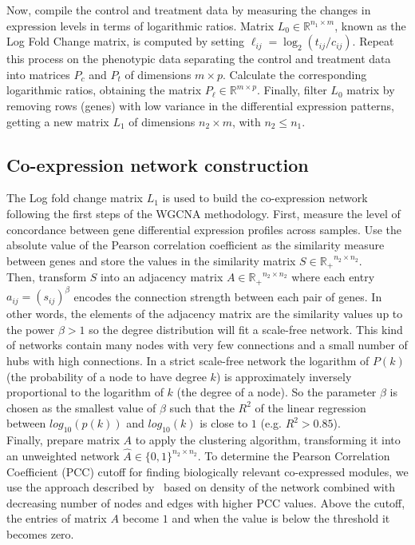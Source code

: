 \documentclass[12pt,journal, onecolumn]{IEEEtran}
\begin{document}
Now, compile the control and treatment data by measuring the changes in expression levels in terms of logarithmic ratios. Matrix $L_0 \in \mathbb{R}^{n_1 \times m}$, known as the Log Fold Change matrix, is computed by setting $\ell_{ij}=\log_2 (t_{ij}/c_{ij})$. Repeat this process on the phenotypic data separating the control and treatment data into matrices $P_c$ and $P_t$ of dimensions $m \times p$. Calculate the corresponding logarithmic ratios, obtaining the matrix $P_\ell \in \mathbb{R}^{m \times p}$. Finally, filter $L_0$ matrix by removing rows (genes) with low variance in the differential expression patterns, getting a new matrix $L_1$ of dimensions $n_2 \times m$, with $n_2 \leq n_1$.\\


\subsection{Co-expression network construction}

The Log fold change matrix $L_1$ is used to build the co-expression network following the first steps of the WGCNA methodology. First, measure the level of concordance between gene differential expression profiles across samples. Use the absolute value of the Pearson correlation coefficient as the similarity measure between genes and store the values in the similarity matrix $S\in \mathbb{R_{+}}^{n_2 \times n_2}$.\\

Then, transform $S$ into an adjacency matrix $A \in \mathbb{R_+}^{n_2\times n_2}$ where each entry $a_{ij} = (s_{ij})^\beta $ encodes the connection strength between each pair of genes. In other words, the elements of the adjacency matrix are the similarity values up to the power $\beta > 1$ so the degree distribution will fit a scale-free network. This kind of networks contain many nodes with very few connections and a small number of hubs with high connections. In a strict scale-free network the logarithm of $P(k)$ (the probability of a node to have degree $k$) is approximately inversely proportional to the logarithm of $k$ (the degree of a node). So the parameter $\beta$ is chosen as the smallest value of $\beta$ such that the $R^2$ of the linear regression between $log_{10}(p(k))$ and $log_{10}(k)$ is close to $1$ (e.g. $R^2 > 0.85$). \\

Finally, prepare matrix $A$ to apply the clustering algorithm, transforming it into an unweighted network $\hat{A} \in \{0,1\}^{n_2 \times n_2}$. To determine the Pearson Correlation Coefficient (PCC) cutoff for finding biologically relevant co-expressed modules, we use the approach described by~\cite{aoki2007approaches} based on density of the network combined with decreasing number of nodes and edges with higher PCC values. 
Above the cutoff, the entries of matrix $A$ become $1$ and when the value is below the threshold it becomes zero.\\
\end{document}
